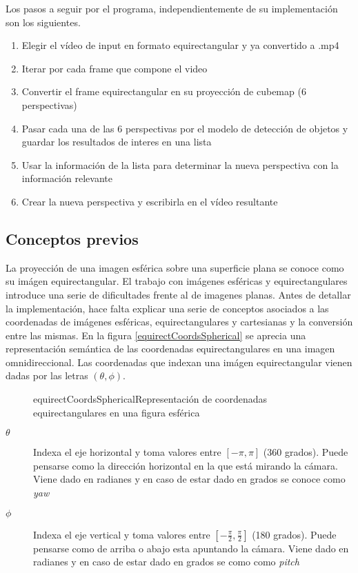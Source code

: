 Los pasos a seguir por el programa, independientemente de su implementación son los siguientes.
\begin{enumerate}
	\item Elegir el vídeo de input en formato equirectangular y ya convertido a .mp4
	\item Iterar por cada frame que compone el video
	\item Convertir el frame equirectangular en su proyección de cubemap (6 perspectivas)
	\item Pasar cada una de las 6 perspectivas por el modelo de detección de objetos y  guardar los resultados de interes en una lista
	\item Usar la información de la lista para determinar la nueva perspectiva con la información relevante
	\item Crear la nueva perspectiva y escribirla en el vídeo resultante

\end{enumerate}

\subsection{Conceptos previos}
La proyección de una imagen esférica sobre una superficie plana se conoce como su imágen equirectangular. El trabajo con imágenes esféricas y equirectangulares introduce una serie de dificultades frente al de imagenes planas. Antes de detallar la implementación, hace falta explicar una serie de conceptos asociados a las coordenadas de imágenes esféricas, equirectangulares y cartesianas y la conversión entre las mismas. En la figura \ref{equirectCoordsSpherical} se aprecia una representación semántica de las coordenadas equirectangulares en una imagen omnidireccional. Las coordenadas que indexan una imágen equirectangular vienen dadas por las letras $(\theta, \phi)$.

\begin{figure}[equirectCoordsSpherical]{equirectCoordsSpherical}{Representación de coordenadas equirectangulares en una figura esférica}
	\begin{center}
	\end{center}
\end{figure}

\begin{description}
	\item[$\theta$] Indexa el eje horizontal y toma valores entre $[-\pi, \pi]$ (360 grados). Puede pensarse como la dirección horizontal en la que está mirando la cámara. Viene dado en radianes y en caso de estar dado en grados se conoce como \textit{yaw}
	\item[$\phi$] Indexa el eje vertical y toma valores entre $[-\frac{\pi}{2}, \frac{\pi}{2}]$ (180 grados). Puede pensarse como de arriba o abajo esta apuntando la cámara. Viene dado en radianes y en caso de estar dado en grados se como como \textit{pitch}
\end{description}

